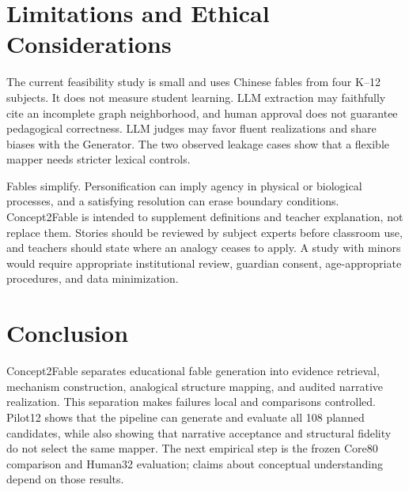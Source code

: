 \documentclass[letterpaper]{article} %
\begin{document}
\section{Limitations and Ethical Considerations}

The current feasibility study is small and uses Chinese fables from four K--12 subjects. It does not measure student learning. LLM extraction may faithfully cite an incomplete graph neighborhood, and human approval does not guarantee pedagogical correctness. LLM judges may favor fluent realizations and share biases with the Generator. The two observed leakage cases show that a flexible mapper needs stricter lexical controls.

Fables simplify. Personification can imply agency in physical or biological processes, and a satisfying resolution can erase boundary conditions. Concept2Fable is intended to supplement definitions and teacher explanation, not replace them. Stories should be reviewed by subject experts before classroom use, and teachers should state where an analogy ceases to apply. A study with minors would require appropriate institutional review, guardian consent, age-appropriate procedures, and data minimization.

\section{Conclusion}

Concept2Fable separates educational fable generation into evidence retrieval, mechanism construction, analogical structure mapping, and audited narrative realization. This separation makes failures local and comparisons controlled. Pilot12 shows that the pipeline can generate and evaluate all 108 planned candidates, while also showing that narrative acceptance and structural fidelity do not select the same mapper. The next empirical step is the frozen Core80 comparison and Human32 evaluation; claims about conceptual understanding depend on those results.


\end{document}
